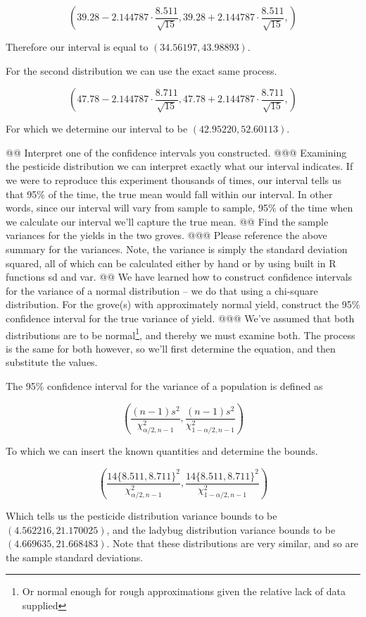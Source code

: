 \documentclass[10pt]{article}
\begin{document}
\begin{easylist}[enumerate]
    \[
        \left(
            39.28 - 2.144787 \cdot \frac{8.511}{\sqrt{15} },
            39.28 + 2.144787 \cdot \frac{8.511}{\sqrt{15} },
        \right)
    \]

    Therefore our interval is equal to $\boxed{(34.56197, 43.98893)}$.\newline

    For the second distribution we can use the exact same process.

    \[
        \left(
            47.78 - 2.144787 \cdot \frac{8.711}{\sqrt{15} },
            47.78 + 2.144787 \cdot \frac{8.711}{\sqrt{15} },
        \right)
    \]

    For which we determine our interval to be $\boxed{(42.95220, 52.60113)}$.

    @@ Interpret one of the confidence intervals you constructed.
    @@@ Examining the pesticide distribution we can interpret exactly what our interval indicates. If we were to
    reproduce this experiment thousands of times, our interval tells us that 95\% of the time, the true mean would fall
    within our interval. In other words, since our interval will vary from sample to sample, 95\% of the time when we
    calculate our interval we'll capture the true mean.
    @@ Find the sample variances for the yields in the two groves.
    @@@ Please reference the above summary for the variances. Note, the variance is simply the standard deviation
    squared, all of which can be calculated either by hand or by using built in {\ttfamily R} functions {\ttfamily sd}
    and {\ttfamily var}.
    @@ We have learned how to construct confidence intervals for the variance of a normal distribution -- we do that
    using a chi-square distribution. For the grove(s) with approximately normal yield, construct the 95\% confidence
    interval for the true variance of yield.
    @@@ We've assumed that both distributions are to be normal\footnote{Or normal enough for rough approximations given
    the relative lack of data supplied}, and thereby we must examine both. The process is the same for both however, so
    we'll first determine the equation, and then substitute the values.\newline

    The 95\% confidence interval for the variance of a population is defined as

    \[
        \left(
            \frac{(n - 1) s^2}{\chi^2_{\alpha/2, n-1} },
            \frac{(n - 1) s^2}{\chi^2_{1 - \alpha/2, n-1} }
        \right)
    \]

    To which we can insert the known quantities and determine the bounds.

    \[
        \left(
            \frac{14 {\{8.511, 8.711\} }^2}{\chi^2_{\alpha/2, n-1} },
            \frac{14 {\{8.511, 8.711\} }^2}{\chi^2_{1 - \alpha/2, n-1} }
        \right)
    \]

    Which tells us the pesticide distribution variance bounds to be $\boxed{(4.562216, 21.170025)}$, and the ladybug
    distribution variance bounds to be $\boxed{(4.669635, 21.668483)}$. Note that these distributions are very similar,
    and so are the sample standard deviations.
\end{easylist}

\newpage
\end{document}

